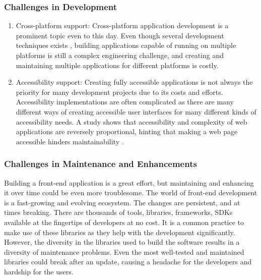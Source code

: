 \subsubsection{Challenges in Development}
\begin{enumerate}
  \item Cross-platform support:
  Cross-platform application development is a prominent topic even to this day. Even though several development techniques exists \cite{PWAs}, building applications capable of running on multiple platforms is still a complex engineering challenge, and creating and maintaining multiple applications for different platforms is costly. 
  \item Accessibility support:
  Creating fully accessible applications is not always the priority for many development projects due to its costs and efforts. Accessibility implementations are often complicated as there are many different ways of creating accessible user interfaces for many different kinds of accessibility needs. A study shows that accessibility and complexity of web applications are reversely proportional, hinting that making a web page accessible hinders maintainability \cite{WebNotForAll}.
\end{enumerate}

\subsubsection{Challenges in Maintenance and Enhancements}
Building a front-end application is a great effort, but maintaining and enhancing it over time could be even more troublesome. The world of front-end development is a fast-growing and evolving ecosystem. The changes are persistent, and at times breaking. There are thousands of tools, libraries, frameworks, SDKs available at the fingertips of developers at no cost. It is a common practice to make use of these libraries as they help with the development significantly. However, the diversity in the libraries used to build the software results in a diversity of maintenance problems. Even the most well-tested and maintained libraries could break after an update, causing a headache for the developers and hardship for the users.